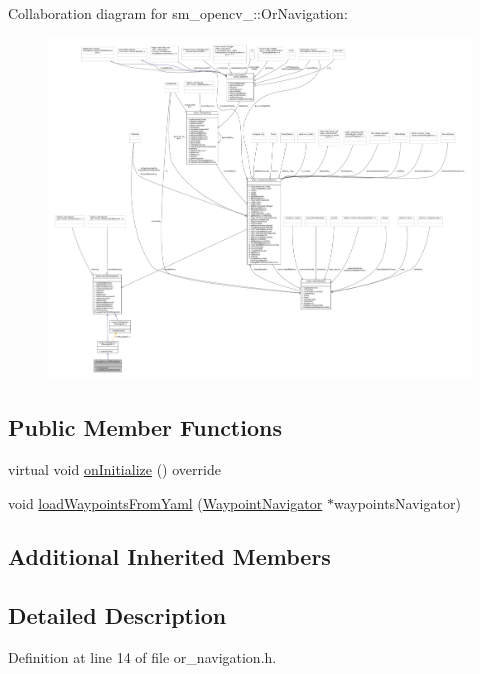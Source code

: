 Collaboration diagram for sm\+\_\+opencv\+\_\+:\+:Or\+Navigation\+:
\nopagebreak
\begin{figure}[H]
\begin{center}
\leavevmode
\includegraphics[width=350pt]{classsm__opencv__3_1_1OrNavigation__coll__graph}
\end{center}
\end{figure}
\subsection*{Public Member Functions}
\begin{DoxyCompactItemize}
\item 
virtual void \hyperlink{classsm__opencv__3_1_1OrNavigation_ac79a0995fbb57ac65d1658e4a3b5e882}{on\+Initialize} () override
\item 
void \hyperlink{classsm__opencv__3_1_1OrNavigation_a50ca7c23fbda3bcfc117fca88fe2dfce}{load\+Waypoints\+From\+Yaml} (\hyperlink{classcl__move__base__z_1_1WaypointNavigator}{Waypoint\+Navigator} $\ast$waypoints\+Navigator)
\end{DoxyCompactItemize}
\subsection*{Additional Inherited Members}


\subsection{Detailed Description}


Definition at line 14 of file or\+\_\+navigation.\+h.



